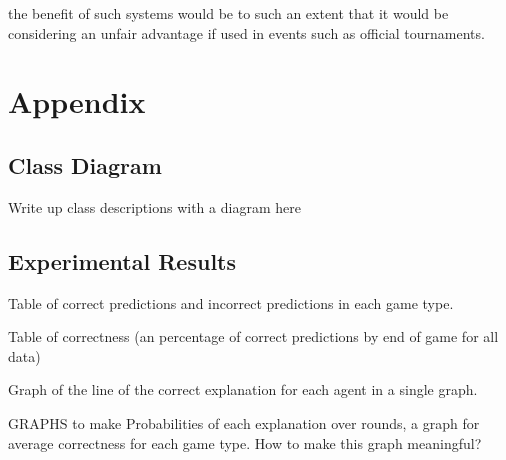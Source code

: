 \documentclass[parskip]{cs4rep}
\begin{document}
the benefit of such systems would be to such an extent that it would be considering an unfair advantage if used in events such as official tournaments.

\chapter{Appendix}

\section{Class Diagram}

Write up class descriptions with a diagram here

\section{Experimental Results}

Table of correct predictions and incorrect predictions in each game type.

Table of correctness (an percentage of correct predictions by end of game for all data)

Graph of the line of the correct explanation for each agent in a single graph.

GRAPHS to make
Probabilities of each explanation over rounds, a graph for average correctness for each game type.
How to make this graph meaningful?



\end{document}
